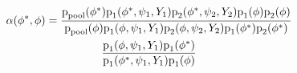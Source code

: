\begin{multline*}
  \alpha (\phi^{*}, \phi) = 
  \frac {
    \text{p}_{\text{pool}} (\phi^{*})
    \text{p}_{1}(\phi^{*}, \psi_{1}, Y_{1})
    \text{p}_{2}(\phi^{*}, \psi_{2}, Y_{2})
    \text{p}_{1}(\phi)
    \text{p}_{2}(\phi)
  } {
    \text{p}_{\text{pool}} (\phi)
    \text{p}_{1}(\phi, \psi_{1}, Y_{1})
    \text{p}_{2}(\phi, \psi_{2}, Y_{2})
    \text{p}_{1}(\phi^{*})
    \text{p}_{2}(\phi^{*})
  } \\
  \frac {
    \text{p}_{1}(\phi, \psi_{1}, Y_{1}) \text{p}_{1}(\phi^{*})
  } {
    \text{p}_{1}(\phi^{*}, \psi_{1}, Y_{1}) \text{p}_{1}(\phi)
  } 
\end{multline*}